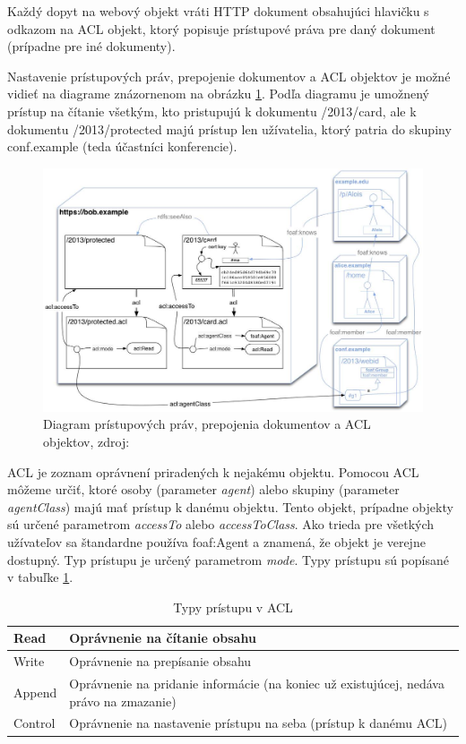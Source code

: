 \documentclass[thesis=M,slovak]{FITthesis}[2013/05/06]
\begin{document}
Každý dopyt na webový objekt vráti HTTP dokument obsahujúci hlavičku s odkazom na ACL objekt, ktorý popisuje prístupové práva pre daný dokument (prípadne pre iné dokumenty).
\cite{WebAccessControl}

Nastavenie prístupových práv, prepojenie dokumentov a ACL objektov je možné vidieť na diagrame znázornenom na obrázku \ref{graphics:WebACL}. Podľa diagramu je umožnený prístup na čítanie všetkým, kto pristupujú k dokumentu /2013/card, ale k dokumentu /2013/protected majú prístup len užívatelia, ktorý patria do skupiny conf.example (teda účastníci konferencie).

\begin{figure}\centering
	\includegraphics[width=1.0\textwidth]{stavy/WebACL.jpg}
 	\caption[Diagram WebACL]{Diagram prístupových práv, prepojenia dokumentov a ACL objektov, zdroj: \cite{WebAccessControl}}\label{graphics:WebACL}
\end{figure}

ACL je zoznam oprávnení priradených k nejakému objektu. Pomocou ACL môžeme určiť, ktoré osoby (parameter {\em agent}) alebo skupiny (parameter {\em agentClass}) majú mať prístup k danému objektu. Tento objekt, prípadne objekty sú určené parametrom {\em accessTo} alebo {\em accessToClass}. Ako trieda pre všetkých užívateľov sa štandardne používa foaf:Agent a znamená, že objekt je verejne dostupný.
Typ prístupu je určený parametrom {\em mode}. Typy prístupu sú popísané v tabuľke \ref{tab:modeACL}.

\begin{table}[!htbp]\centering
 	\caption[Typy prístupu v ACL]{Typy prístupu v ACL}\label{tab:modeACL}
\begin{tabularx}{\textwidth}{|l|X|} \hline
Read	        & Oprávnenie na čítanie obsahu \\ \hline
Write 	& Oprávnenie na prepísanie obsahu \\ \hline
Append	& Oprávnenie na pridanie informácie (na koniec už existujúcej, nedáva právo na zmazanie)  \\ \hline
Control	& Oprávnenie na nastavenie prístupu na seba (prístup k danému ACL) \\ \hline
\end{tabularx}
\end{table} 
\end{document}
